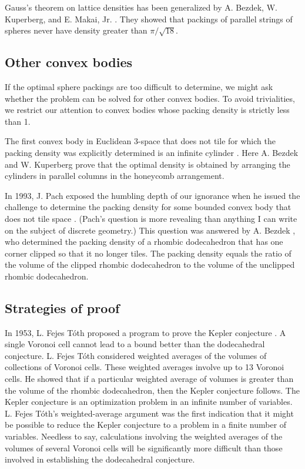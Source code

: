 Gauss's theorem on lattice densities has been generalized by
A. Bezdek, W. Kuperberg, and E. Makai, Jr. \cite{BKM91}.
They showed that packings of parallel
strings of spheres never have density greater than $\pi/\sqrt{18}$.

\subsection{Other convex bodies}

If the optimal sphere packings are too difficult to determine,
we might ask whether
the problem can be solved for other convex bodies.
To avoid trivialities, we restrict our attention to convex bodies
whose packing density is strictly less than 1.

  The first convex body in Euclidean 3-space that does not tile
for which the packing density was explicitly determined is
an infinite cylinder \cite{Bez90}.
Here A. Bezdek and W. Kuperberg prove
that the
optimal density is obtained by arranging the cylinders in
parallel columns in the honeycomb arrangement.

In 1993, J. Pach exposed the humbling depth of our ignorance when he issued
the challenge to determine the packing density for some bounded convex
body that does not tile space \cite{MP93}.
(Pach's question is more revealing than anything I can write on
the subject of discrete geometry.)
 This question was answered by
A. Bezdek \cite{Bez94}, who determined the packing density of a rhombic
dodecahedron that has one corner clipped so that it no longer tiles.
The packing density equals the ratio of the
volume of the clipped
rhombic dodecahedron to the volume of the unclipped rhombic dodecahedron.

\subsection{Strategies of proof}

In 1953, L. Fejes T\'oth proposed a program to prove the
Kepler conjecture \cite{Fej53}.
A single Voronoi cell cannot lead to a bound better
than the dodecahedral conjecture.   L. Fejes T\'oth considered
weighted averages of the volumes of collections of Voronoi cells.
 These weighted
averages involve up to 13 Voronoi cells.  He showed that if a particular
weighted average of volumes is greater than the volume of the
rhombic dodecahedron, then the Kepler conjecture follows.
The Kepler conjecture is an optimization problem in an infinite
number of variables.  L. Fejes T\'oth's weighted-average argument
was the first indication that it might be possible to reduce
the Kepler conjecture to a problem in a finite number of variables.
Needless to say, calculations involving the weighted averages of the
volumes of
several Voronoi cells will be significantly more difficult than those
involved in establishing the dodecahedral conjecture.

